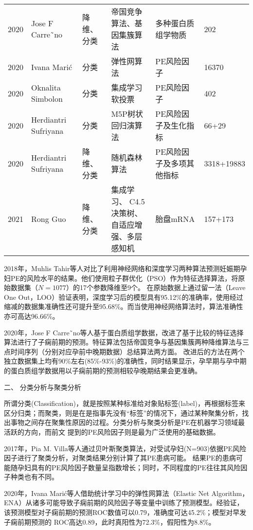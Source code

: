 \begin{landscape}
\begin{longtable}{m{1cm}<{\centering}m{4cm}<{\centering}m{3cm}<{\centering}m{4.5cm}<{\centering}m{4.5cm}<{\centering}m{2cm}<{\centering}}
        2020&Jose F Carre˜no\cite{Carreno2020}&降维、分类&帝国竞争算法、基因集簇算法&多种蛋白质组学物质&202\\
        2020&Ivana Mari{\'{c}}\cite{Maric2020}&分类&弹性网算法&PE风险因子&16370\\
        2020&Oknalita Simbolon\cite{Simbolon2020}&分类&集成学习软投票&PE风险因子&402\\
        2020&Herdiantri Sufriyana\cite{Sufriyana2020-1}&分类&M5P树状回归演算法&PE风险因子及生化指标&66+29\\
        2020&Herdiantri Sufriyana\cite{Sufriyana2020}&降维、分类&随机森林算法&PE风险因子及多项其他指标&3318+19883\\
        2021&Rong Guo\cite{Guo2021}&降维、分类&\tabincell{c}{集成学习、 C4.5决策树、\\自适应增强、多层感知机}&胎盘mRNA&157+173\\
	\end{longtable}
\end{landscape}

2018年，Muhlis Tahir等人\cite{Tahir2018,Tahir2018-2}对比了利用神经网络和深度学习两种算法预测妊娠期孕妇PE的风险水平的结果。他们使用粒子群优化（PSO）作为特征选择算法，将原始数据集（$N=1077$）的17个参数降维至9个。
在原始数据上通过留一法（Leave One Out，LOO）验证表明，深度学习后的模型具有95.12\%的准确率，使用经过缩减的数据集准确性还可提升至95.68\%。而当使用神经网络算法时，算法准确性亦可高达96.66\%。

2020年，Jose F Carre˜no等人\cite{Carreno2020}基于蛋白质组学数据，改进了基于比较的特征选择算法进行了子痫前期的预测。特征算法包括帝国竞争与基因集簇两种降维算法与三点时间序列（分别对应孕前中晚期数据）总结算法两方面。
改进后的方法在两个独立数据集上均有90\%左右(85\%-93\%)的准确性，同时结果显示，孕早期与孕中期的蛋白质组学数据用以子痫前期的预测相较孕晚期结果会更准确。

二、 分类分析与聚类分析

所谓分类(Classification)，就是按照某种标准给对象贴标签(label)，再根据标签来区分归类；而聚类，则是在是指事先没有“标签”的情况下，通过某种聚集分析，找出事物之间存在聚集性原因的过程。分类分析与聚类分析是PE在机器学习领域最活跃的方向，而前文
提到的PE风险因子则是最为广泛使用的基础数据。

2017年，Pia M. Villa等人\cite{Villa2017}通过贝叶斯聚类算法，对受试孕妇(N=903)依据PE风险因子进行了聚类分析，对聚类结果分别计算了其PE患病可能。
结果PE的患病可能随孕妇具有的PE风险因子数量呈指数增长；同时，不同程度的PE往往其风险因子种类也有不同。

2020年，Ivana Mari{\'{c}}\cite{Maric2020}等人借助统计学习中的弹性网算法（Elastic Net Algorithm，ENA）从诸多可能导致子痫前期的风险因子等变量中训练了预测模型。经验证，该预测模型对子痫前期的预测ROC数值可以0.79，准确度可达45.2\%；模型对早发子痫前期预测的
ROC高达0.89，此时真阳性为72.3\%，假阳性为8.8\%。

